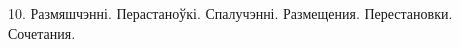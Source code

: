 



\biLangHeader
{10. Размяшчэнні. Перастаноўкі. Спалучэнні.}
{Размещения. Перестановки. Сочетания.}

\begin{problemList}

\problemItemSimple
{}
{}

\problemItemSimple
{}
{}

\problemItemSimple
{}
{}

\problemItemSimple
{}
{}

\problemItemSimple
{}
{}

\problemItemSimple
{}
{}

\problemItemSimple
{}
{}

\problemItemSimple
{}
{}

\problemItemSimple
{}
{}

\problemItemSimple
{}
{}

\problemItemSimple
{}
{}

\problemItemSimple
{}
{}

\problemItemSimple
{}
{}

\problemItemSimple
{}
{}

\end{problemList}



